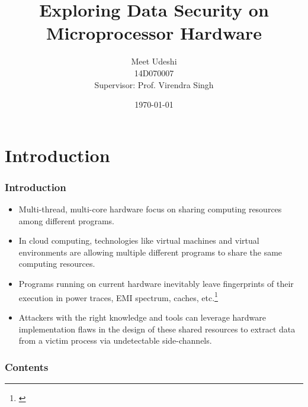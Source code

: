 \documentclass[10pt]{beamer}
\title[DDP Presentation]{Exploring Data Security on Microprocessor Hardware} %
\author{Meet Udeshi\\
14D070007\\
Supervisor: Prof. Virendra Singh} %
\institute[CADSL] %
{
CADSL - IIT Bombay %
}
\date{\today} %
\begin{document}
\begin{frame}
\titlepage %
\end{frame}


\section{Introduction}


\begin{frame}
\frametitle{Introduction}
\begin{itemize}
    \item Multi-thread, multi-core hardware focus on sharing computing resources
        among different programs.
    \item In cloud computing, technologies like virtual machines and virtual environments
        are allowing multiple different programs to share the same computing resources.
    \item Programs running on current hardware inevitably leave fingerprints of
        their execution in power traces, EMI spectrum,
        caches, etc.\footnote{\cite{side_channel_intro}}
    \item Attackers with the right knowledge and tools can leverage hardware
        implementation flaws in the design of these shared resources
        to extract data from a victim process via undetectable side-channels.
\end{itemize}
\end{frame}

\begin{frame}
\frametitle{Contents} %
\tableofcontents %
\end{frame}
\end{document}
